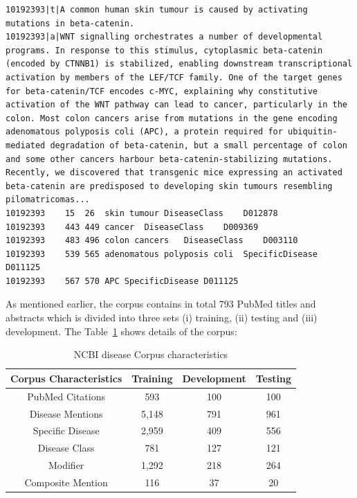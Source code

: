 \begin{lstlisting}[caption=An example of annotation, label=annotation]
10192393|t|A common human skin tumour is caused by activating mutations in beta-catenin.
10192393|a|WNT signalling orchestrates a number of developmental programs. In response to this stimulus, cytoplasmic beta-catenin (encoded by CTNNB1) is stabilized, enabling downstream transcriptional activation by members of the LEF/TCF family. One of the target genes for beta-catenin/TCF encodes c-MYC, explaining why constitutive activation of the WNT pathway can lead to cancer, particularly in the colon. Most colon cancers arise from mutations in the gene encoding adenomatous polyposis coli (APC), a protein required for ubiquitin-mediated degradation of beta-catenin, but a small percentage of colon and some other cancers harbour beta-catenin-stabilizing mutations. Recently, we discovered that transgenic mice expressing an activated beta-catenin are predisposed to developing skin tumours resembling pilomatricomas... 
10192393	15	26	skin tumour	DiseaseClass	D012878
10192393	443	449	cancer	DiseaseClass	D009369
10192393	483	496	colon cancers	DiseaseClass	D003110
10192393	539	565	adenomatous polyposis coli	SpecificDisease	D011125
10192393	567	570	APC	SpecificDisease	D011125

\end{lstlisting}

As mentioned earlier, the corpus contains in total 793 PubMed titles and abstracts which is divided into three sets (i) training, (ii) testing and (iii) development. The Table~\ref{table_ncbi} shows details of the corpus:

\begin{table}[h!]
\caption{NCBI disease Corpus characteristics}
\label{table_ncbi}
\begin{tabular}{|c|c|c|c|}
\hline
\textbf{Corpus Characteristics} & \textbf{Training} & \textbf{Development} & \textbf{Testing} \\ \hline
PubMed Citations                & 593               & 100                  & 100              \\ \hline
Disease Mentions                & 5,148             & 791                  & 961              \\ \hline
Specific Disease                & 2,959             & 409                  & 556              \\ \hline
Disease Class                   & 781               & 127                  & 121              \\ \hline
Modifier                        & 1,292             & 218                  & 264              \\ \hline
Composite Mention               & 116               & 37                   & 20               \\ \hline
\end{tabular}
\end{table}

